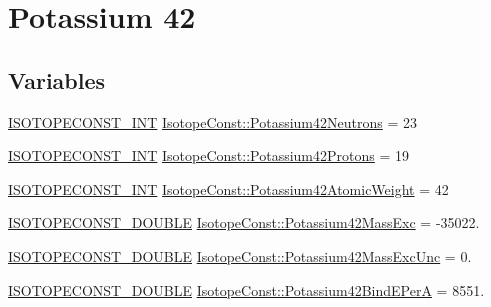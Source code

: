 \hypertarget{group___isotope_const-_potassium-_k42}{}\section{Potassium 42}
\label{group___isotope_const-_potassium-_k42}
\subsection*{Variables}
\begin{DoxyCompactItemize}
\item 
\mbox{\hyperlink{group___isotope_const-_macros_ga5f18360b3e99483a35c32d789e62621c}{I\+S\+O\+T\+O\+P\+E\+C\+O\+N\+S\+T\+\_\+\+I\+NT}} \mbox{\hyperlink{group___isotope_const-_potassium-_k42_gaf93312c440c9db1ed06d219ea83d281e}{Isotope\+Const\+::\+Potassium42\+Neutrons}} = 23
\item 
\mbox{\hyperlink{group___isotope_const-_macros_ga5f18360b3e99483a35c32d789e62621c}{I\+S\+O\+T\+O\+P\+E\+C\+O\+N\+S\+T\+\_\+\+I\+NT}} \mbox{\hyperlink{group___isotope_const-_potassium-_k42_gacb57a8d6781c66b6835857361ef71da6}{Isotope\+Const\+::\+Potassium42\+Protons}} = 19
\item 
\mbox{\hyperlink{group___isotope_const-_macros_ga5f18360b3e99483a35c32d789e62621c}{I\+S\+O\+T\+O\+P\+E\+C\+O\+N\+S\+T\+\_\+\+I\+NT}} \mbox{\hyperlink{group___isotope_const-_potassium-_k42_ga0a6fc647d3e1ee7967caa55b60d3f41f}{Isotope\+Const\+::\+Potassium42\+Atomic\+Weight}} = 42
\item 
\mbox{\hyperlink{group___isotope_const-_macros_ga8f45a7272ce02c0b4c65c44636ed719a}{I\+S\+O\+T\+O\+P\+E\+C\+O\+N\+S\+T\+\_\+\+D\+O\+U\+B\+LE}} \mbox{\hyperlink{group___isotope_const-_potassium-_k42_ga7603301904f6ab7c12ff05e610517a49}{Isotope\+Const\+::\+Potassium42\+Mass\+Exc}} = -\/35022.
\item 
\mbox{\hyperlink{group___isotope_const-_macros_ga8f45a7272ce02c0b4c65c44636ed719a}{I\+S\+O\+T\+O\+P\+E\+C\+O\+N\+S\+T\+\_\+\+D\+O\+U\+B\+LE}} \mbox{\hyperlink{group___isotope_const-_potassium-_k42_gac458f7700da98b565b855f395a7a348e}{Isotope\+Const\+::\+Potassium42\+Mass\+Exc\+Unc}} = 0.
\item 
\mbox{\hyperlink{group___isotope_const-_macros_ga8f45a7272ce02c0b4c65c44636ed719a}{I\+S\+O\+T\+O\+P\+E\+C\+O\+N\+S\+T\+\_\+\+D\+O\+U\+B\+LE}} \mbox{\hyperlink{group___isotope_const-_potassium-_k42_ga509b9b12903ff6a26b1d2797a327ca73}{Isotope\+Const\+::\+Potassium42\+Bind\+E\+PerA}} = 8551.
\item 

\end{DoxyCompactItemize}
